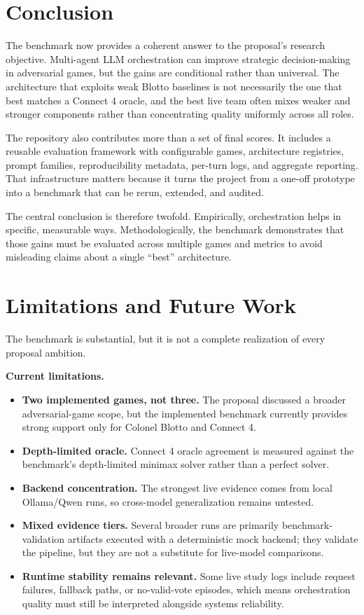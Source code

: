 \documentclass[11pt]{article}
\begin{document}
\section{Conclusion}
The benchmark now provides a coherent answer to the proposal's research objective. Multi-agent LLM orchestration can improve strategic decision-making in adversarial games, but the gains are conditional rather than universal. The architecture that exploits weak Blotto baselines is not necessarily the one that best matches a Connect 4 oracle, and the best live team often mixes weaker and stronger components rather than concentrating quality uniformly across all roles.

The repository also contributes more than a set of final scores. It includes a reusable evaluation framework with configurable games, architecture registries, prompt families, reproducibility metadata, per-turn logs, and aggregate reporting. That infrastructure matters because it turns the project from a one-off prototype into a benchmark that can be rerun, extended, and audited.

The central conclusion is therefore twofold. Empirically, orchestration helps in specific, measurable ways. Methodologically, the benchmark demonstrates that those gains must be evaluated across multiple games and metrics to avoid misleading claims about a single ``best'' architecture.

\section{Limitations and Future Work}
The benchmark is substantial, but it is not a complete realization of every proposal ambition.

\textbf{Current limitations.}
\begin{itemize}
  \item \textbf{Two implemented games, not three.} The proposal discussed a broader adversarial-game scope, but the implemented benchmark currently provides strong support only for Colonel Blotto and Connect 4.
  \item \textbf{Depth-limited oracle.} Connect 4 oracle agreement is measured against the benchmark's depth-limited minimax solver rather than a perfect solver.
  \item \textbf{Backend concentration.} The strongest live evidence comes from local Ollama/Qwen runs, so cross-model generalization remains untested.
  \item \textbf{Mixed evidence tiers.} Several broader runs are primarily benchmark-validation artifacts executed with a deterministic mock backend; they validate the pipeline, but they are not a substitute for live-model comparisons.
  \item \textbf{Runtime stability remains relevant.} Some live study logs include request failures, fallback paths, or no-valid-vote episodes, which means orchestration quality must still be interpreted alongside systems reliability.
\end{itemize}
\end{document}
